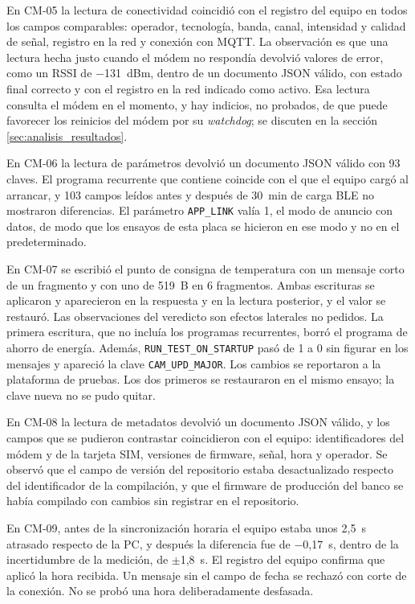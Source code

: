 En CM-05 la lectura de conectividad coincidió con el registro del equipo en todos los campos comparables: operador, tecnología, banda, canal, intensidad y calidad de señal, registro en la red y conexión con MQTT. La observación es que una lectura hecha justo cuando el módem no respondía devolvió valores de error, como un RSSI de $-$131~dBm, dentro de un documento JSON válido, con estado final correcto y con el registro en la red indicado como activo. Esa lectura consulta el módem en el momento, y hay indicios, no probados, de que puede favorecer los reinicios del módem por su \textit{watchdog}; se discuten en la sección \ref{sec:analisis_resultados}.

En CM-06 la lectura de parámetros devolvió un documento JSON válido con 93 claves. El programa recurrente que contiene coincide con el que el equipo cargó al arrancar, y 103 campos leídos antes y después de 30~min de carga BLE no mostraron diferencias. El parámetro \texttt{APP\_LINK} valía 1, el modo de anuncio con datos, de modo que los ensayos de esta placa se hicieron en ese modo y no en el predeterminado.

En CM-07 se escribió el punto de consigna de temperatura con un mensaje corto de un fragmento y con uno de 519~B en 6 fragmentos. Ambas escrituras se aplicaron y aparecieron en la respuesta y en la lectura posterior, y el valor se restauró. Las observaciones del veredicto son efectos laterales no pedidos. La primera escritura, que no incluía los programas recurrentes, borró el programa de ahorro de energía. Además, \texttt{RUN\_TEST\_ON\_STARTUP} pasó de 1 a 0 sin figurar en los mensajes y apareció la clave \texttt{CAM\_UPD\_MAJOR}. Los cambios se reportaron a la plataforma de pruebas. Los dos primeros se restauraron en el mismo ensayo; la clave nueva no se pudo quitar.

En CM-08 la lectura de metadatos devolvió un documento JSON válido, y los campos que se pudieron contrastar coincidieron con el equipo: identificadores del módem y de la tarjeta SIM, versiones de firmware, señal, hora y operador. Se observó que el campo de versión del repositorio estaba desactualizado respecto del identificador de la compilación, y que el firmware de producción del banco se había compilado con cambios sin registrar en el repositorio.

En CM-09, antes de la sincronización horaria el equipo estaba unos 2,5~s atrasado respecto de la PC, y después la diferencia fue de $-$0,17~s, dentro de la incertidumbre de la medición, de $\pm$1,8~s. El registro del equipo confirma que aplicó la hora recibida. Un mensaje sin el campo de fecha se rechazó con corte de la conexión. No se probó una hora deliberadamente desfasada.

